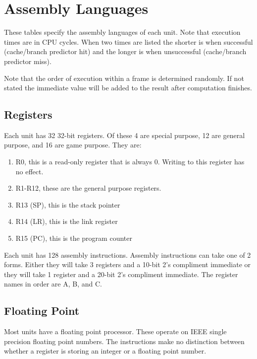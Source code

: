 \documentclass{article}
\begin{document}
\section*{Assembly Languages}

These tables specify the assembly languages of each unit. Note that execution
times are in CPU cycles. When two times are listed the shorter is when
successful (cache/branch predictor hit) and the longer is when unsuccessful
(cache/branch predictor miss).

Note that the order of execution within a frame is determined randomly. If not
stated the immediate value will be added to the result after computation
finishes.

\subsection*{Registers}

Each unit has 32 32-bit registers. Of these 4 are special purpose, 12 are
general purpose, and 16 are game purpose. They are:

\begin{enumerate}[noitemsep]
    \item R0, this is a read-only register that is always 0. Writing to this
        register has no effect.
    \item R1-R12, these are the general purpose registers.
    \item R13 (SP), this is the stack pointer
    \item R14 (LR), this is the link register
    \item R15 (PC), this is the program counter
\end{enumerate}

Each unit has 128 assembly instructions. Assembly instructions can take one of 2
forms. Either they will take 3 registers and a 10-bit 2's compliment immediate
or they will take 1 register and a 20-bit 2's compliment immediate. The register
names in order are A, B, and C.

\subsection*{Floating Point}

Most units have a floating point processor. These operate on IEEE single
precision floating point numbers. The instructions make no distinction between
whether a register is storing an integer or a floating point number.
\end{document}
